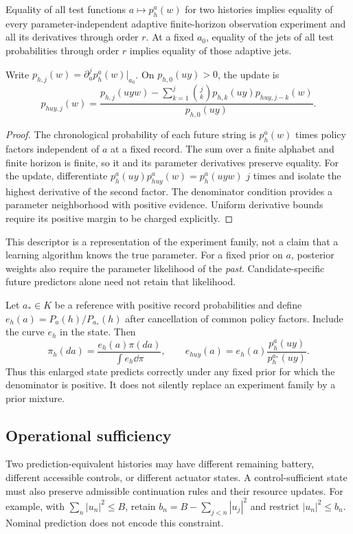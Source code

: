 \begin{theorem}\label{thm:response-state}
Equality of all test functions $a\mapsto p_h^a(w)$ for two histories implies equality of every parameter-independent adaptive finite-horizon observation experiment and all its derivatives through order $r$. At a fixed $a_0$, equality of the jets of all test probabilities through order $r$ implies equality of those adaptive jets.

Write $p_{h,j}(w)=\partial_a^jp_h^a(w)|_{a_0}$. On $p_{h,0}(uy)>0$, the update is
\begin{equation}
 p_{huy,j}(w)=\frac{p_{h,j}(uyw)-
 \sum_{k=1}^j\binom jk p_{h,k}(uy)p_{huy,j-k}(w)}{p_{h,0}(uy)}.
 \label{eq:prediction-jets}
\end{equation}
\end{theorem}
\begin{proof}
The chronological probability of each future string is $p_h^a(w)$ times policy factors independent of $a$ at a fixed record. The sum over a finite alphabet and finite horizon is finite, so it and its parameter derivatives preserve equality. For the update, differentiate
$p_h^a(uy)p_{huy}^a(w)=p_h^a(uyw)$ $j$ times and isolate the highest derivative of the second factor. The denominator condition provides a parameter neighborhood with positive evidence. Uniform derivative bounds require its positive margin to be charged explicitly.
\end{proof}

This descriptor is a representation of the experiment family, not a claim that a learning algorithm knows the true parameter. For a fixed prior on $a$, posterior weights also require the parameter likelihood of the \emph{past}. Candidate-specific future predictors alone need not retain that likelihood.

Let $a_*\in K$ be a reference with positive record probabilities and define
$e_h(a)=P_a(h)/P_{a_*}(h)$ after cancellation of common policy factors. Include the curve $e_h$ in the state. Then
\[
 \pi_h(da)=\frac{e_h(a)\pi(da)}{\int e_h\dd\pi},\qquad
 e_{huy}(a)=e_h(a)\frac{p_h^a(uy)}{p_h^{a_*}(uy)}.
\]
Thus this enlarged state predicts correctly under any fixed prior for which the denominator is positive. It does not silently replace an experiment family by a prior mixture.

\subsection{Operational sufficiency}
Two prediction-equivalent histories may have different remaining battery, different accessible controls, or different actuator states. A control-sufficient state must also preserve admissible continuation rules and their resource updates. For example, with $\sum_n|u_n|^2\le B$, retain
$b_n=B-\sum_{j<n}|u_j|^2$ and restrict $|u_n|^2\le b_n$. Nominal prediction does not encode this constraint.

